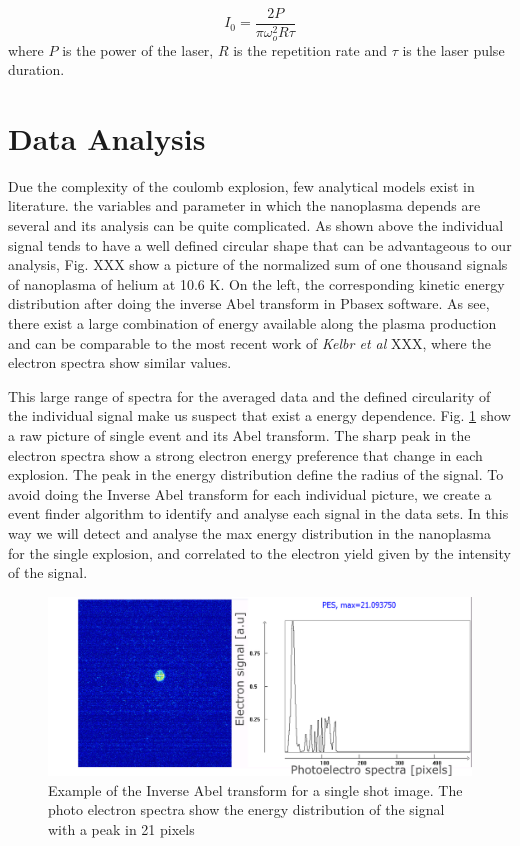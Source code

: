 \begin{equation}
I_{0}=\dfrac{2P}{\pi \omega_{o}^{2}R \tau}
\end{equation} 
 where $P$
is the power of the laser, $R$ is the repetition rate and $\tau$ is the laser pulse duration.




\section{Data Analysis}

Due the complexity of the coulomb explosion, few analytical models exist in literature. the variables and parameter in which the nanoplasma depends are several and its analysis can be quite complicated. As shown above the individual signal tends to have a well defined circular shape that can be advantageous to our analysis, Fig. XXX show a picture of the normalized sum of one thousand signals  of nanoplasma of helium at 10.6 K. On the left, the corresponding kinetic energy  distribution after doing the inverse Abel transform in Pbasex software. As see, there  exist a large combination of energy available along the plasma production and  can be comparable to the most recent work of \textit{Kelbr et al} XXX, where the electron spectra show  similar values.

This large range of spectra for the averaged data and the defined circularity of the individual signal make us suspect that exist a energy dependence. Fig. \ref{fig:abeltransf} show a raw picture of single event and its  Abel transform. The sharp peak in the electron spectra show a strong electron energy preference that change in each explosion. The peak in the energy distribution define the radius of the signal. To avoid doing the Inverse Abel transform for each individual picture, we create a event finder algorithm to  identify and analyse each signal in the data sets. In this way we will detect and analyse the max energy distribution in the nanoplasma for the single explosion, and correlated to the electron yield given by the intensity of the signal.
 
\begin{figure}[hbtp]
 \centering
 \includegraphics[width=12 cm]{../Images/abel inverse transform.png}
 \caption[Abel inverse transform example]{Example of the Inverse Abel transform for a single shot image. The photo electron spectra show the energy distribution of the signal with a peak in 21 pixels}
 \label{fig:abeltransf}
 \end{figure}
   

